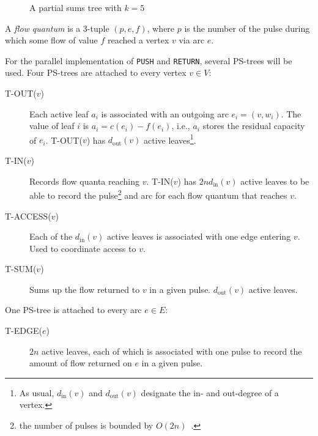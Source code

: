 \documentclass[a4paper,10pt, twocolumn]{article}
\begin{document}
\begin{figure}[H]
\begin{center}
\end{center}
\caption{A partial sums tree with $k=5$}
\label{fig:pstree}
\end{figure}

A \emph{flow quantum} is a 3-tuple $(p, e, f)$, where $p$ is the number of the pulse during which some flow of value $f$ reached a vertex $v$ via arc $e$.

For the parallel implementation of \lstinline|PUSH| and \lstinline|RETURN|, several PS-trees will be used. Four PS-trees are attached to every vertex $v \in V$:
\begin{description}
	\item [T-OUT($v$)] Each active leaf $a_i$ is associated with an outgoing arc $e_i = (v, w_i)$. The value of leaf $i$ is $a_i = c(e_i) - f(e_i)$, i.e., $a_i$ stores the residual capacity of $e_i$. T-OUT($v$) has $d_{\mathrm{out}}(v)$ active leaves\footnote{As usual, $d_{\mathrm{in}}(v)$ and $d_{\mathrm{out}}(v)$ designate the in- and out-degree of a vertex.}.
	\item [T-IN($v$)] Records flow quanta reaching $v$. T-IN($v$) has $2nd_{\mathrm{in}}(v)$ active leaves to be able to record the pulse\footnote{the number of pulses is bounded by $O(2n)$~\cite{yossi81}.} and arc for each flow quantum that reaches $v$. 
	\item [T-ACCESS($v$)] Each of the $d_{\mathrm{in}}(v)$ active leaves is associated with one edge entering $v$. Used to coordinate access to $v$.
	\item [T-SUM($v$)] Sums up the flow returned to $v$ in a given pulse. $d_{\mathrm{out}}(v)$ active leaves. 
\end{description}
One PS-tree is attached to every arc $e \in E$:
\begin{description}
	\item [T-EDGE($e$)] $2n$ active leaves, each of which is associated with one pulse to record the amount of flow returned on $e$ in a given pulse.
\end{description}
\end{document}
